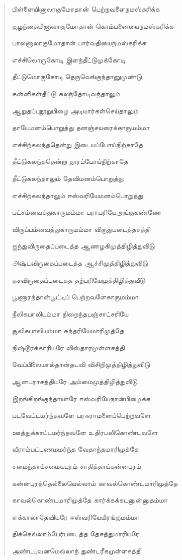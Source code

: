 \documentclass{article}
\begin{document}
\begin{quotation}
{பிள்ளையினாலாகுமோதான் பெற்றவளைநமஸ்கரிக்க

குழந்தையினாலாகுமோதான்‌ கொம்பனையைநமஸ்கரிக்க

பாலனாலாகுமோதான்‌ பார்வதியைநமஸ்கரிக்க

எச்சிலொருகோடி இளந்தீட்டுமுக்கோடி

தீட்டுமொருகோடி தெருவெங்குந்தானுமுண்டு

கன்னிகள்தீட்டு கலந்தோடிவந்தாலும்

ஆறுதப்புநூறுபிழை அடியார்கள்செய்தாலும்

தாயேமனம்பொறுத்து தனஞ்சயரைக்காருமம்மா

எச்சிற்கலந்ததென்று இடையப்போய்நிற்காதே

தீட்டுகலந்ததென்று தூரப்போய்நிற்காதே

தீட்டுகலந்தாலும் தேவிமனம்பொறுத்து

எச்சிற்கலந்தாலும் ஈஸ்வரியேமனம்பொறுத்து

பட்சம்வைத்துகாருமம்மா பராபரியேஅங்குகண்ணே

விருப்பம்வைத்துகாருமம்மா விருதுபடைத்தசத்தி

ஐந்துவிருதைப்படைத்த ஆணழகிமுத்திழித்‌துவிடு

௮ஷ்டவிருதைப்படைத்த ஆச்சிமுத்திழித்‌துவிடு

தசவிருதைப்படைதத தற்பரியேமுத்திழித்‌துவீடு

பூணாரந்தான்‌பூட்டிப்‌ பெற்றவளேகாருமம்மா

நீலிகபாலியம்மா நிறைந்தபஞ்சாட்சரியே

சூலிகபாலியம்மா சுந்தரியேமாரிமுத்தே

நிஷ்டூரக்காரியரே விஸ்தாரமுள்ளசத்தி

வேப்பிலையால்தான்தடவி விசிறிமுத்திழித்துவிடு

ஆனபராசத்தியரே அம்மைமுத்திழித்துவிடு

இறங்கிறங்குந்தாயாரே ஈஸ்வரியேநான்பிழைக்க

படவேட்டமர்ந்தவளே பரசுராமனைப்பெற்றவளே

ஊத்துக்காட்டமர்ந்தவளே உதிரபலிகொண்டவளே

வீராம்பட்டணமமர்ந்த வேதாந்தமாரிமுத்தே

சமைந்தாய்சமையபுரம் சாதித்தாய்கன்னபுரம்

கன்னபுரத்தெல்லையெல்லாம் காவல்கொண்டமாரிமுத்தே

காவல்கொண்டமாரிமுத்தே கார்க்கக்கடனுன்னுதம்மா

எக்காலாதேவியரே ஈஸ்வரியேயிரங்குமம்மா

திக்கெல்லாம்பேர்படைத்த தேசத்துமாரியரே

அண்டபுவனமெல்லாந் துண்டரீகமுள்ளசத்தி

}
\end{quotation}
\end{document}

